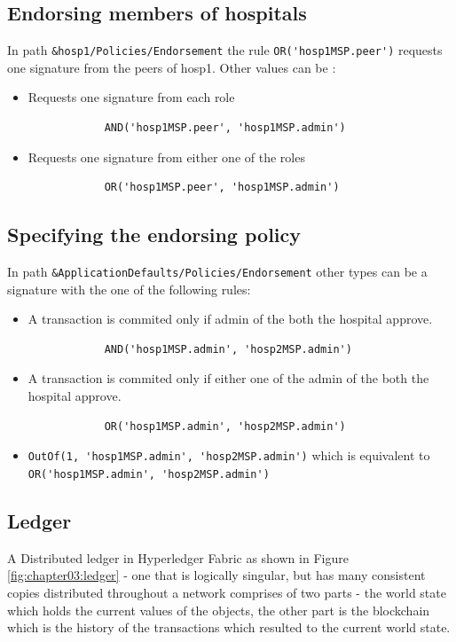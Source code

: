 \subsection{Endorsing members of hospitals}
In path \lstinline{&hosp1/Policies/Endorsement} the rule \lstinline{OR('hosp1MSP.peer')}  requests one signature from the peers of hosp1. Other values can be : \\ 
\begin{itemize}
    \item Requests one signature from each role 
        \begin{lstlisting}
            AND('hosp1MSP.peer', 'hosp1MSP.admin')
        \end{lstlisting} 
    \item Requests one signature from either one of the roles 
        \begin{lstlisting}
            OR('hosp1MSP.peer', 'hosp1MSP.admin') 
        \end{lstlisting} 
\end{itemize}

\subsection{Specifying the endorsing policy}
In path \lstinline{&ApplicationDefaults/Policies/Endorsement} other types can be a signature with the one of the following rules:
\begin{itemize}
    \item A transaction is commited only if admin of the both the hospital approve.
        \begin{lstlisting}
            AND('hosp1MSP.admin', 'hosp2MSP.admin') 
        \end{lstlisting} 
    \item A transaction is commited only if either one of the admin of the both the hospital approve. 
        \begin{lstlisting}
            OR('hosp1MSP.admin', 'hosp2MSP.admin')
        \end{lstlisting} 
    \item \lstinline{OutOf(1, 'hosp1MSP.admin', 'hosp2MSP.admin')} which is equivalent to \lstinline{OR('hosp1MSP.admin', 'hosp2MSP.admin')}
\end{itemize}

\subsection{Ledger}
A Distributed ledger in Hyperledger Fabric as shown in Figure \ref{fig:chapter03:ledger} - one that is logically singular, but has many consistent copies distributed throughout a network comprises of two parts - the world state which holds the current values of the objects, the other part is the blockchain which is the history of the transactions which resulted to the current world state\cite{Ledger}.

